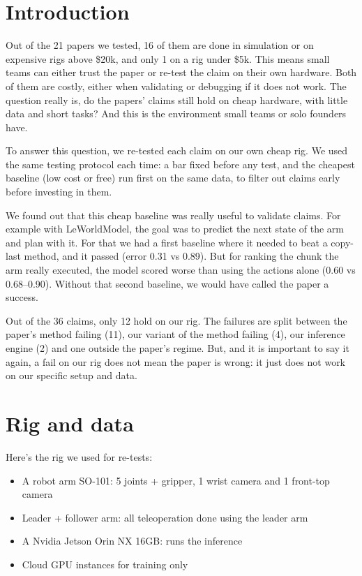 \documentclass[10pt,twocolumn]{article}
\begin{document}
\section{Introduction}


Out of the 21 papers we tested, 16 of them are done in simulation or on expensive rigs above \$20k, and only 1 on a rig under \$5k. This means small teams can either trust the paper or re-test the claim on their own hardware. Both of them are costly, either when validating or debugging if it does not work. The question really is, do the papers' claims still hold on cheap hardware, with little data and short tasks? And this is the environment small teams or solo founders have.


To answer this question, we re-tested each claim on our own cheap rig. We used the same testing protocol each time: a bar fixed before any test, and the cheapest baseline (low cost or free) run first on the same data, to filter out claims early before investing in them.


We found out that this cheap baseline was really useful to validate claims. For example with LeWorldModel, the goal was to predict the next state of the arm and plan with it. For that we had a first baseline where it needed to beat a copy-last method, and it passed (error 0.31 vs 0.89). But for ranking the chunk the arm really executed, the model scored worse than using the actions alone (0.60 vs 0.68--0.90). Without that second baseline, we would have called the paper a success.


Out of the 36 claims, only 12 hold on our rig. The failures are split between the paper's method failing (11), our variant of the method failing (4), our inference engine (2) and one outside the paper's regime. But, and it is important to say it again, a fail on our rig does not mean the paper is wrong: it just does not work on our specific setup and data.


\section{Rig and data}


Here's the rig we used for re-tests:


\begin{itemize}\setlength{\itemsep}{0pt}\setlength{\parskip}{0pt}\footnotesize
\item A robot arm SO-101: 5 joints + gripper, 1 wrist camera and 1 front-top camera
\item Leader + follower arm: all teleoperation done using the leader arm
\item A Nvidia Jetson Orin NX 16GB: runs the inference
\item Cloud GPU instances for training only
\end{itemize}
\end{document}
